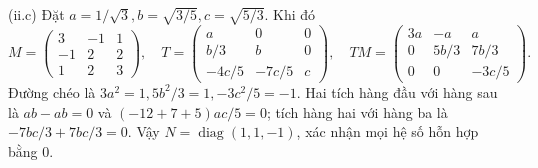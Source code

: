 \documentclass[10pt,a4paper]{article}
\begin{document}
(ii.c) Đặt $a=1/\sqrt3,b=\sqrt{3/5},c=\sqrt{5/3}$. Khi đó
\[M=\begin{pmatrix}3&-1&1\\-1&2&2\\1&2&3\end{pmatrix},\quad
T=\begin{pmatrix}a&0&0\\b/3&b&0\\-4c/5&-7c/5&c\end{pmatrix},\quad
TM=\begin{pmatrix}3a&-a&a\\0&5b/3&7b/3\\0&0&-3c/5\end{pmatrix}.\]
Đường chéo là $3a^2=1,5b^2/3=1,-3c^2/5=-1$. Hai tích hàng đầu với hàng sau là $ab-ab=0$ và $(-12+7+5)ac/5=0$; tích hàng hai với hàng ba là $-7bc/3+7bc/3=0$. Vậy $N=\operatorname{diag}(1,1,-1)$, xác nhận mọi hệ số hỗn hợp bằng $0$.
\end{document}
